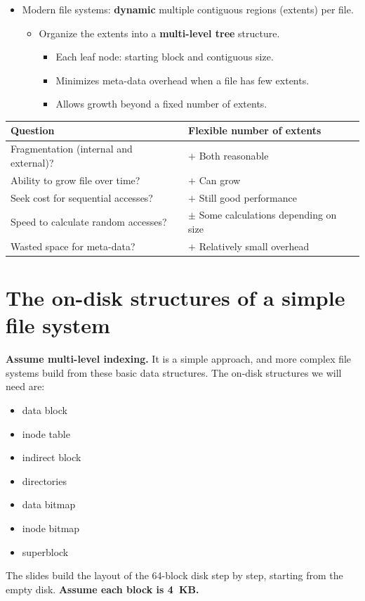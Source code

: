 \documentclass[11pt,a4paper]{article}
\begin{document}
\begin{itemize}
  \item Modern file systems: \textbf{dynamic} multiple contiguous regions
        (extents) per file.
  \begin{itemize}
    \item Organize the extents into a \textbf{multi-level tree} structure.
    \begin{itemize}
      \item Each leaf node: starting block and contiguous size.
      \item Minimizes meta-data overhead when a file has few extents.
      \item Allows growth beyond a fixed number of extents.
    \end{itemize}
  \end{itemize}
\end{itemize}

\begin{center}
\renewcommand{\arraystretch}{1.2}
\begin{tabularx}{\textwidth}{@{}lX@{}}
  \toprule
  \textbf{Question} & \textbf{Flexible number of extents} \\
  \midrule
  Fragmentation (internal and external)? & $+$ Both reasonable \\
  Ability to grow file over time? & $+$ Can grow \\
  Seek cost for sequential accesses? & $+$ Still good performance \\
  Speed to calculate random accesses? & $\pm$ Some calculations depending on size \\
  Wasted space for meta-data? & $+$ Relatively small overhead \\
  \bottomrule
\end{tabularx}
\end{center}

\section{The on-disk structures of a simple file system}\label{sec:vsfs}

\textbf{Assume multi-level indexing.} It is a simple approach, and more
complex file systems build from these basic data structures. The on-disk
structures we will need are:
\begin{itemize}
  \item data block
  \item inode table
  \item indirect block
  \item directories
  \item data bitmap
  \item inode bitmap
  \item superblock
\end{itemize}
The slides build the layout of the 64-block disk step by step, starting
from the empty disk. \textbf{Assume each block is 4~KB.}
\end{document}
